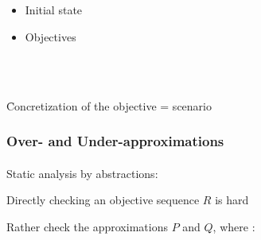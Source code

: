 \begin{frame}
\begin{columns}
\begin{column}{0.45\textwidth}
~\\~\\
\begin{itemize}
  \item Initial state
    \\  \pause
  \item Objectives
    \\  \pause
    \\\smallskip {} \pause
    \\\smallskip \rex{$[\ \Rsh d_2\ ]$} \pause
\end{itemize}

\end{column}
\end{columns}

\medskip
\begin{center}
\f Concretization of the objective = scenario

\end{center}
\end{frame}



\begin{frame}
  \frametitle{Over- and Under-approximations}
  \framesubtitle{\tcite{\cpmrmscs}}

Static analysis by abstractions:
\begin{fleches}
  \item Directly checking an objective sequence $R$ is hard
  \item Rather check the approximations $P$ and $Q$, where :
\end{fleches}

\begin{center}
\scalebox{0.6}{
\figsa
}
\end{center}

\end{frame}



